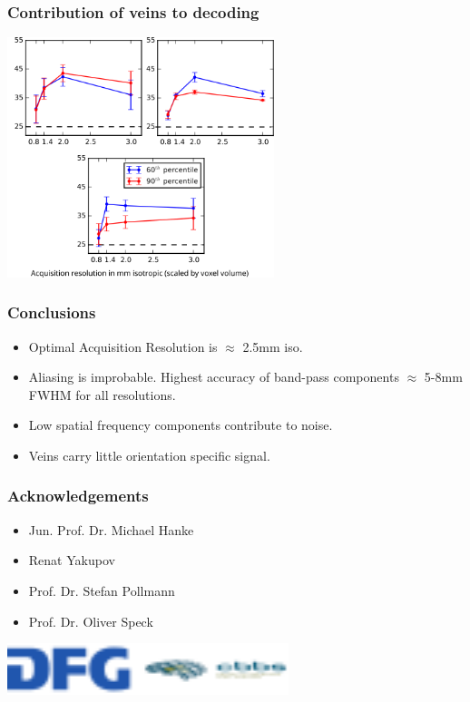 \documentclass{beamer}
\begin{document}
  \begin{frame}
    \frametitle{Contribution of veins to decoding}
        \begin{center}
            \includegraphics[height=7cm]{../pictures/veins}
        \end{center}
    \end{frame} 

  \begin{frame}
    \frametitle{Conclusions}
        \begin{center}
        \begin{itemize}
         \item Optimal Acquisition Resolution is $\approx$ 2.5mm iso.
         \item Aliasing is improbable. Highest accuracy of band-pass 
         components $\approx$ 5-8mm FWHM for all resolutions.
         \item Low spatial frequency components contribute to noise.
         \item Veins carry little orientation specific signal.
        \end{itemize}  
        \end{center}
    \end{frame} 

  \begin{frame}
    \frametitle{Acknowledgements}
        \begin{itemize}
         \item Jun. Prof. Dr. Michael Hanke
         \item Renat Yakupov
         \item Prof. Dr. Stefan Pollmann
         \item Prof. Dr. Oliver Speck
        \end{itemize}
        \vspace{1cm}
        \begin{center} 
            \includegraphics[height=1.5cm]{../pictures/funding}
        \end{center}
    \end{frame}
\end{document}
